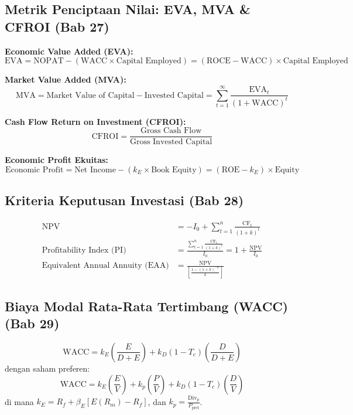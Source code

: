 \documentclass[10pt,a4paper]{article}
\begin{document}
\subsection{Metrik Penciptaan Nilai: EVA, MVA \& CFROI (Bab 27)}

\textbf{Economic Value Added (EVA):}
\begin{equation}
\boxed{\text{EVA} = \text{NOPAT} - (\text{WACC} \times \text{Capital Employed}) = (\text{ROCE} - \text{WACC}) \times \text{Capital Employed}}
\end{equation}

\textbf{Market Value Added (MVA):}
\begin{equation}
\text{MVA} = \text{Market Value of Capital} - \text{Invested Capital} = \sum_{t=1}^\infty \frac{\text{EVA}_t}{(1 + \text{WACC})^t}
\end{equation}

\textbf{Cash Flow Return on Investment (CFROI):}
\begin{equation}
\text{CFROI} = \frac{\text{Gross Cash Flow}}{\text{Gross Invested Capital}}
\end{equation}

\textbf{Economic Profit Ekuitas:}
\begin{equation}
\text{Economic Profit} = \text{Net Income} - (k_E \times \text{Book Equity}) = (\text{ROE} - k_E) \times \text{Equity}
\end{equation}

\subsection{Kriteria Keputusan Investasi (Bab 28)}

\begin{align}
\text{NPV} &= -I_0 + \sum_{t=1}^n \frac{\text{CF}_t}{(1 + k)^t} \\
\text{Profitability Index (PI)} &= \frac{\sum_{t=1}^n \frac{\text{CF}_t}{(1 + k)^t}}{I_0} = 1 + \frac{\text{NPV}}{I_0} \\
\text{Equivalent Annual Annuity (EAA)} &= \frac{\text{NPV}}{\left[\frac{1 - (1 + k)^{-n}}{k}\right]}
\end{align}

\subsection{Biaya Modal Rata-Rata Tertimbang (WACC) (Bab 29)}

\begin{equation}
\boxed{\text{WACC} = k_E \left(\frac{E}{D + E}\right) + k_D (1 - T_c) \left(\frac{D}{D + E}\right)}
\end{equation}
dengan saham preferen:
\begin{equation}
\text{WACC} = k_E \left(\frac{E}{V}\right) + k_p \left(\frac{P}{V}\right) + k_D (1 - T_c) \left(\frac{D}{V}\right)
\end{equation}
di mana $k_E = R_f + \beta_E [E(R_m) - R_f]$, dan $k_p = \frac{\text{Div}_p}{P_{\text{pref}}}$.
\end{document}
